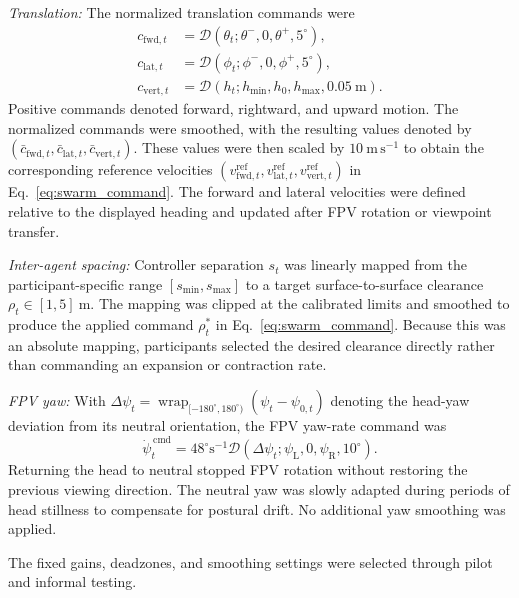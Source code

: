 \emph{Translation:}
The normalized translation commands were
\begin{align}
c_{\mathrm{fwd},t}
&=\mathcal{D}(\theta_t;\theta^{-},0,\theta^{+},5^{\circ}),
\nonumber\\
c_{\mathrm{lat},t}
&=\mathcal{D}(\phi_t;\phi^{-},0,\phi^{+},5^{\circ}),
\nonumber\\
c_{\mathrm{vert},t}
&=\mathcal{D}(h_t;h_{\min},h_0,h_{\max},0.05~\mathrm{m}).
\label{eq:body_rate_commands}
\end{align}
Positive commands denoted forward, rightward, and upward motion. The normalized
commands were smoothed, with the resulting values denoted by
$(\bar c_{\mathrm{fwd},t},\bar c_{\mathrm{lat},t},
\bar c_{\mathrm{vert},t})$. These values were then scaled by
$10~\mathrm{m\,s^{-1}}$ to obtain the corresponding reference velocities
$(v_{\mathrm{fwd},t}^{\mathrm{ref}},v_{\mathrm{lat},t}^{\mathrm{ref}},
v_{\mathrm{vert},t}^{\mathrm{ref}})$ in Eq.~\eqref{eq:swarm_command}.
The forward and lateral velocities were defined relative to the displayed
heading and updated after FPV rotation or viewpoint transfer.

\emph{Inter-agent spacing:}
Controller separation $s_t$ was linearly mapped from the participant-specific
range $[s_{\min},s_{\max}]$ to a target surface-to-surface clearance
$\rho_t\in[1,5]~\mathrm{m}$. The mapping was clipped at the calibrated limits and
smoothed to produce the applied command $\rho_t^*$ in
Eq.~\eqref{eq:swarm_command}. Because this was an absolute mapping,
participants selected the desired clearance directly rather than commanding
an expansion or contraction rate.

\emph{FPV yaw:}
With
$\Delta\psi_t=
\operatorname{wrap}_{[-180^{\circ},180^{\circ})}
(\psi_t-\psi_{0,t})$
denoting the head-yaw deviation from its neutral orientation, the FPV yaw-rate
command was
\begin{equation}
\dot{\psi}^{\,\mathrm{cmd}}_t
=
48^{\circ}\mathrm{s}^{-1}
\mathcal{D}\!\left(
\Delta\psi_t;\psi_{\mathrm{L}},0,\psi_{\mathrm{R}},10^{\circ}
\right).
\label{eq:yaw_rate}
\end{equation}
Returning the head to neutral stopped FPV rotation without restoring the
previous viewing direction. The neutral yaw was slowly adapted during periods
of head stillness to compensate for postural drift. No additional yaw
smoothing was applied.

The fixed gains, deadzones, and smoothing settings were selected through pilot
and informal testing.

